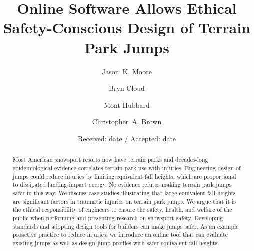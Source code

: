 \documentclass[smallextended]{svjour3}       %
\begin{document}
\title{Online Software Allows Ethical Safety-Conscious Design of Terrain Park Jumps}

\author{
  Jason~K. Moore \and
  Bryn Cloud \and
  Mont Hubbard \and
  Christopher~A. Brown
}


\date{Received: date / Accepted: date}

\maketitle

\begin{abstract}
  Most American snowsport resorts now have terrain parks and decades-long
  epidemiological evidence correlates terrain park use with injuries.
  Engineering design of jumps could reduce injuries by limiting equivalent fall
  heights, which are proportional to dissipated landing impact energy.  No
  evidence refutes making terrain park jumps safer in this way. We discuss case
  studies illustrating that large equivalent fall heights are significant
  factors in traumatic injuries on terrain park jumps. We argue that it is the
  ethical responsibility of engineers to ensure the safety, health, and welfare
  of the public when performing and presenting research on snowsport safety.
  Developing standards and adopting design tools for builders can make jumps
  safer. As an example proactive practice to
  reduce injuries, we introduce an online tool that can evaluate existing jumps as well
  as design jump profiles with safer equivalent fall heights.
\end{abstract}
\end{document}
